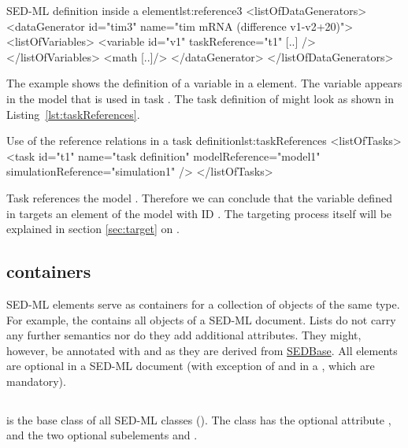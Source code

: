 \begin{myXmlLst}{SED-ML  definition inside a  element}{lst:reference3}
<listOfDataGenerators>
	<dataGenerator id="tim3" name="tim mRNA (difference v1-v2+20)">
	<listOfVariables>
   		<variable id="v1" taskReference="t1" [..] />
  	</listOfVariables>
  	<math [..]/>
	</dataGenerator>
</listOfDataGenerators>
\end{myXmlLst}

The example shows the definition of a variable  in a  element. The variable appears in the model that is used in task . The task definition of  might look as shown in Listing~\ref{lst:taskReferences}.

\begin{myXmlLst}{Use of the reference relations in a task definition}{lst:taskReferences}
<listOfTasks>
	<task id="t1" name="task definition" modelReference="model1" simulationReference="simulation1" />
</listOfTasks>
\end{myXmlLst}
Task  references the model . Therefore we can conclude that the variable  defined in  targets an element of the model with ID . The targeting process itself will be explained in section \ref{sec:target} on .



\subsection{ containers}
\label{class:listOf}
SED-ML  elements serve as containers for a collection of objects of the same type. For example, the \hyperref[class:listOfModels]{} contains all \Model objects of a SED-ML document. Lists do not carry any further semantics nor do they add additional attributes. They might, however, be annotated with \Notes and \Annotation as they are derived from \hyperref[class:sedBase]{SEDBase}. All  elements are optional in a SED-ML document (with exception of \hyperref[class:listOfRanges]{} and \hyperref[class:subTask]{} in a \RepeatedTask, which are mandatory).


\subsection{}
\label{class:sedBase}
 is the base class of all SED-ML classes (). The  class has the optional attribute \hyperref[sec:metaid]{}, and the two optional subelements \hyperref[sec:notesElement]{} and \hyperref[sec:annotationElement]{}. 

